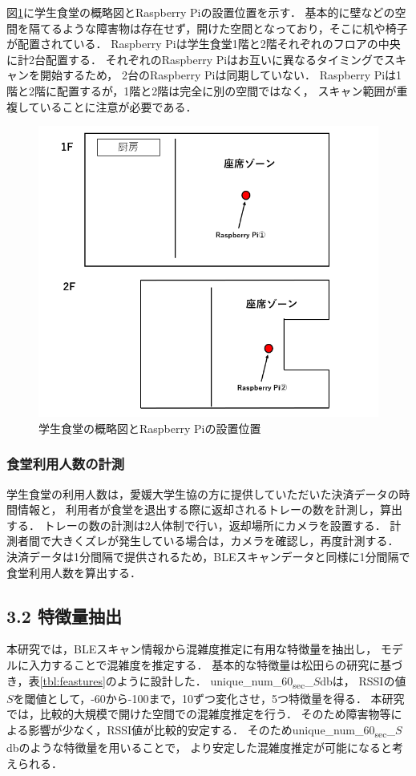 図\ref{raspi_place}に学生食堂の概略図とRaspberry Piの設置位置を示す．
基本的に壁などの空間を隔てるような障害物は存在せず，開けた空間となっており，そこに机や椅子が配置されている．
Raspberry Piは学生食堂1階と2階それぞれのフロアの中央に計2台配置する．
それぞれのRaspberry Piはお互いに異なるタイミングでスキャンを開始するため，
2台のRaspberry Piは同期していない．
Raspberry Piは1階と2階に配置するが，1階と2階は完全に別の空間ではなく，
スキャン範囲が重複していることに注意が必要である．
\begin{figure}[pt]
  \includegraphics[scale=0.6]{./images/raspi_place.png}
  \centering
  \caption{学生食堂の概略図とRaspberry Piの設置位置\label{raspi_place}}
\end{figure}

\subsubsection*{食堂利用人数の計測}
学生食堂の利用人数は，愛媛大学生協の方に提供していただいた決済データの時間情報と，
利用者が食堂を退出する際に返却されるトレーの数を計測し，算出する．
トレーの数の計測は2人体制で行い，返却場所にカメラを設置する．
計測者間で大きくズレが発生している場合は，カメラを確認し，再度計測する．
決済データは1分間隔で提供されるため，BLEスキャンデータと同様に1分間隔で食堂利用人数を算出する．

\subsection*{3.2 特徴量抽出}
本研究では，BLEスキャン情報から混雑度推定に有用な特徴量を抽出し，
モデルに入力することで混雑度を推定する．
基本的な特徴量は松田らの研究\cite{senkou}に基づき，表\ref{tbl:feastures}のように設計した．
unique\_num\_60\textsubscript{sec}\_$S$dbは，
RSSIの値$S$を閾値として，-60から-100まで，10ずつ変化させ，5つ特徴量を得る．
本研究では，比較的大規模で開けた空間での混雑度推定を行う．
そのため障害物等による影響が少なく，RSSI値が比較的安定する．
そのためunique\_num\_60\textsubscript{sec}\_$S$dbのような特徴量を用いることで，
より安定した混雑度推定が可能になると考えられる．


